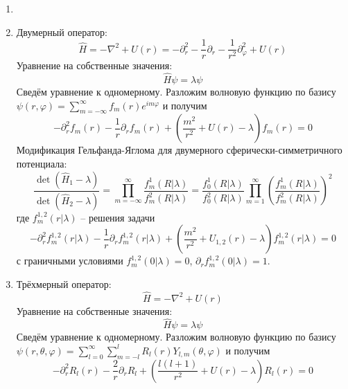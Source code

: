 \documentclass[12pt]{article}
\theoremstyle{definition}
\begin{document}
\begin{enumerate}
    \item 
    \item Двумерный оператор:
    \begin{equation}
        \hat{H}=-\nabla^2+U(r)=-\partial^2_r-\frac{1}{r}\partial_r-\frac{1}{r^2}\partial^2_\varphi+U(r)
    \end{equation}
    Уравнение на собственные значения:
    \begin{equation}
        \hat{H}\psi=\lambda\psi
    \end{equation}
    Сведём уравнение к одномерному. Разложим волновую функцию по базису $\psi(r,\varphi)=\sum\limits_{m=-\infty}^\infty f_m(r)e^{im\varphi}$ и получим
    \begin{equation}
        -\partial^2_rf_m(r)-\frac{1}{r}\partial_rf_m(r)+\left(\frac{m^2}{r^2}+U(r)-\lambda\right)f_m(r)=0
    \end{equation}
    Модификация Гельфанда-Яглома для двумерного сферически-симметричного потенциала:
    \begin{equation}
        \boxed{\frac{\det(\hat{H}_1-\lambda)}{\det(\hat{H}_2-\lambda)}=\prod\limits_{m=-\infty}^\infty\frac{f^1_m(R|\lambda)}{f^2_m(R|\lambda)}=\frac{f^1_0(R|\lambda)}{f^2_0(R|\lambda)}\prod\limits_{m=1}^\infty\left(\frac{f^1_m(R|\lambda)}{f^2_m(R|\lambda)}\right)^2}
    \end{equation}
    где $f_m^{1,2}(r|\lambda)$ -- решения задачи
    \begin{equation}
        -\partial^2_rf^{1,2}_m(r|\lambda)-\frac{1}{r}\partial_rf^{1,2}_m(r|\lambda)+\left(\frac{m^2}{r^2}+U_{1,2}(r)-\lambda\right)f^{1,2}_m(r|\lambda)=0
    \end{equation}
    с граничными условиями $f^{1,2}_m(0|\lambda)=0$, $\partial_rf^{1,2}_m(0|\lambda)=1$.
    \item Трёхмерный оператор:
    \begin{equation}
        \hat{H}=-\nabla^2+U(r)
    \end{equation}
    Уравнение на собственные значения:
    \begin{equation}
        \hat{H}\psi=\lambda\psi
    \end{equation}
    Сведём уравнение к одномерному. Разложим волновую функцию по базису $\psi(r,\theta,\varphi)=\sum\limits_{l=0}^\infty\sum\limits_{m=-l}^l R_l(r)Y_{l,m}(\theta,\varphi)$ и получим
    \begin{equation}
        -\partial^2_rR_l(r)-\frac{2}{r}\partial_rR_l+\left(\frac{l(l+1)}{r^2}+U(r)-\lambda\right)R_l(r)=0

\end{equation}
\end{enumerate}
\end{document}
